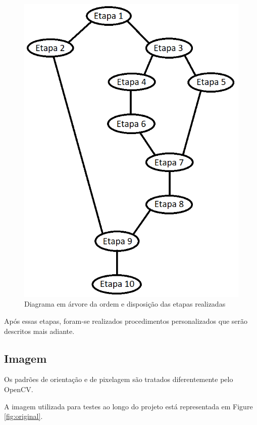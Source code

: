 \documentclass[10pt,twocolumn,letterpaper]{article}
\begin{document}
\begin{figure}[!htb]
\centering
\includegraphics[width=\columnwidth]{introducao.png}
\caption{Diagrama em árvore da ordem e disposição das etapas realizadas}
\label{fig:intro}
\end{figure}

	Após essas etapas, foram-se realizados procedimentos personalizados que serão descritos mais adiante.

\subsection{Imagem}

	Os padrões de orientação e de pixelagem são tratados diferentemente pelo OpenCV.

	A imagem utilizada para testes ao longo do projeto está representada em Figure \ref{fig:original}.
\end{document}
